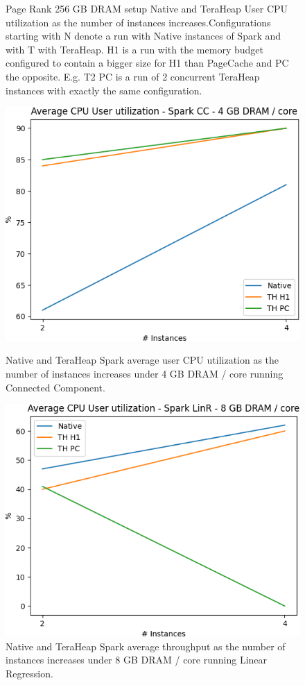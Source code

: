 \begin{figure}[thbp]
    \caption{Page Rank 256 GB DRAM setup Native and TeraHeap
    User CPU utilization as the number of instances increases.Configurations
    starting with N denote a run with Native instances of Spark and
    with T with TeraHeap. H1 is a run with the memory budget
    configured to contain a bigger size for H1 than PageCache and PC
    the opposite. E.g. T2 PC is a run of 2 concurrent TeraHeap
    instances with exactly the same configuration. }
                \label{fig:pr_256_usr}
		\fi
        \includegraphics[width=\linewidth]{./fig/CC_64_USR.png}
    \caption{Native and TeraHeap Spark average user CPU utilization
        as the number of instances increases under 4 GB DRAM / core running Connected Component.}
        \label{fig:cc_64_usr}
        \includegraphics[width=\linewidth]{./fig/LINR_128_USR.png}
    \caption{Native and TeraHeap Spark average throughput
        as the number of instances increases under 8 GB DRAM / core running Linear Regression.}
        \label{fig:linr_128_usr}
\end{figure}

